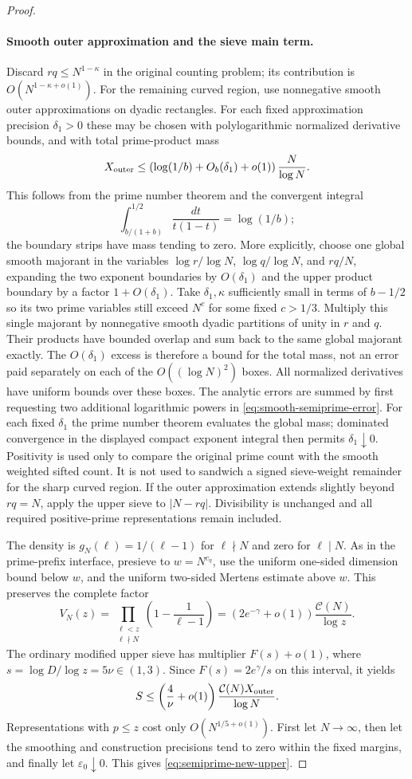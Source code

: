 \documentclass[11pt]{article}
\newcommand{\CN}{\mathcal C(N)}
\begin{document}
\begin{proof}
\paragraph{Smooth outer approximation and the sieve main term.}
Discard $rq\le N^{1-\kappa}$ in the original counting problem;
its contribution is $O(N^{1-\kappa+o(1)})$.
For the remaining curved region, use nonnegative smooth outer
approximations on dyadic rectangles. For each fixed approximation
precision $\delta_1>0$ these may be chosen with polylogarithmic
normalized derivative bounds, and with total prime-product mass
\[
 X_{\rm outer}
 \le \left(\log(1/b)+O_b(\delta_1)+o(1)\right)\frac{N}{\log N}.
\]
This follows from the prime number theorem and the convergent
integral
\[
 \int_{b/(1+b)}^{1/2}\frac{dt}{t(1-t)}=\log(1/b);
\]
the boundary strips have mass tending to zero.
More explicitly, choose one global smooth majorant in the variables
$\log r/\log N$, $\log q/\log N$, and $rq/N$, expanding the two
exponent boundaries by $O(\delta_1)$ and the upper product boundary
by a factor $1+O(\delta_1)$. Take $\delta_1,\kappa$ sufficiently
small in terms of $b-1/2$ so its two prime variables still exceed
$N^c$ for some fixed $c>1/3$.
Multiply this single majorant by nonnegative smooth dyadic
partitions of unity in $r$ and $q$. Their products have bounded
overlap and sum back to the same global majorant exactly.
The $O(\delta_1)$ excess is therefore a bound for the total mass,
not an error paid separately on each of the $O((\log N)^2)$ boxes.
All normalized derivatives have uniform bounds over these boxes.
The analytic errors are summed by first requesting two additional
logarithmic powers in \eqref{eq:smooth-semiprime-error}.
For each fixed $\delta_1$ the prime number theorem evaluates the
global mass; dominated convergence in the displayed compact
exponent integral then permits $\delta_1\downarrow0$.
Positivity is used only to compare the original prime count with
the smooth weighted sifted count. It is not used to sandwich a
signed sieve-weight remainder for the sharp curved region.
If the outer approximation extends slightly beyond $rq=N$,
apply the upper sieve to $|N-rq|$. Divisibility is unchanged
and all required positive-prime representations remain included.

The density is $g_N(\ell)=1/(\ell-1)$ for $\ell\nmid N$
and zero for $\ell\mid N$.
As in the prime-prefix interface, presieve to $w=N^{c_\eta}$,
use the uniform one-sided dimension bound below $w$, and the
uniform two-sided Mertens estimate above $w$. This preserves
the complete factor
\[
 V_N(z)=\prod_{\substack{\ell<z\\\ell\nmid N}}
             \left(1-\frac1{\ell-1}\right)
       =(2e^{-\gamma}+o(1))\frac{\CN}{\log z}.
\]
The ordinary modified upper sieve has multiplier $F(s)+o(1)$,
where $s=\log D/\log z=5\nu\in(1,3)$.
Since $F(s)=2e^\gamma/s$ on this interval, it yields
\[
 S\le\left(\frac4\nu+o(1)\right)
                   \frac{\CN X_{\rm outer}}{\log N}.
\]
Representations with $p\le z$ cost only $O(N^{1/5+o(1)})$.
First let $N\to\infty$, then let the smoothing and construction
precisions tend to zero within the fixed margins, and finally
let $\varepsilon_0\downarrow0$.
This gives \eqref{eq:semiprime-new-upper}.
\end{proof}
\end{document}
